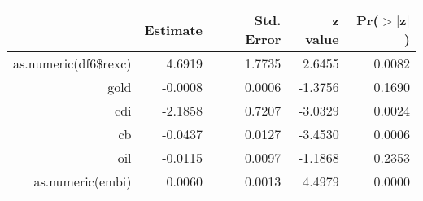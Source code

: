 \begin{table}[ht]
\centering
\begin{tabular}{rrrrr}
  \hline
 & Estimate & Std. Error & z value & Pr($>$$|$z$|$) \\ 
  \hline
as.numeric(df6\$rexc) & 4.6919 & 1.7735 & 2.6455 & 0.0082 \\ 
  gold & -0.0008 & 0.0006 & -1.3756 & 0.1690 \\ 
  cdi & -2.1858 & 0.7207 & -3.0329 & 0.0024 \\ 
  cb & -0.0437 & 0.0127 & -3.4530 & 0.0006 \\ 
  oil & -0.0115 & 0.0097 & -1.1868 & 0.2353 \\ 
  as.numeric(embi) & 0.0060 & 0.0013 & 4.4979 & 0.0000 \\ 
   \hline
\end{tabular}
\end{table}
